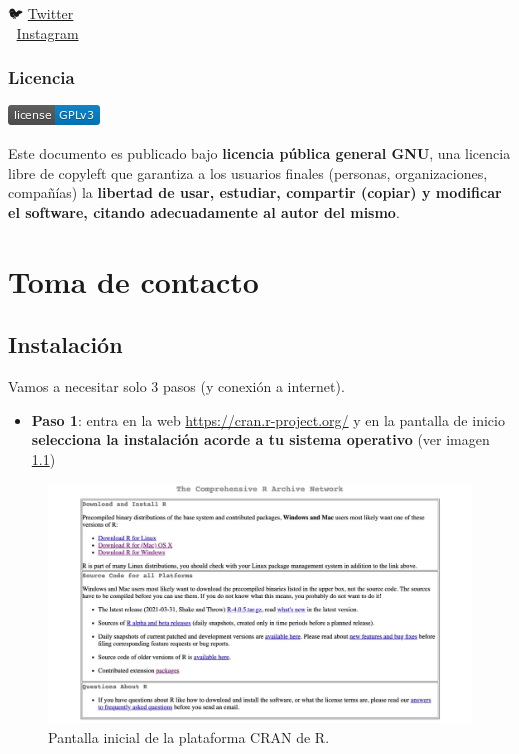\documentclass[11pt,]{book}
\providecommand{\tightlist}{%
  \setlength{\itemsep}{0pt}\setlength{\parskip}{0pt}}
\begin{document}
🐦 \href{twitter.com/dadosdelaplace}{Twitter}\\
📸 \href{instagram.com/javieralvarezliebana}{Instagram}

\hypertarget{licencia}{%
\section*{Licencia}\label{licencia}}


\href{https://www.gnu.org/licenses/gpl-3.0}{\includegraphics{img/license-GPLv3-blue.png}}

Este documento es publicado bajo \textbf{licencia pública general GNU}, una licencia libre de copyleft que garantiza a los usuarios finales (personas, organizaciones, compañías) la \textbf{libertad de usar, estudiar, compartir (copiar) y modificar el software, citando adecuadamente al autor del mismo}.

\hypertarget{part-toma-de-contacto}{%
\part{Toma de contacto}\label{part-toma-de-contacto}}

\hypertarget{instalacionR}{%
\chapter{Instalación}\label{instalacionR}}

Vamos a necesitar solo 3 pasos (y conexión a internet).

\begin{itemize}
\tightlist
\item
  \textbf{Paso 1}: entra en la web \url{https://cran.r-project.org/} y en la pantalla de inicio \textbf{selecciona la instalación acorde a tu sistema operativo} (ver imagen \ref{fig:pantalla-cran})
\end{itemize}

\begin{figure}

{\centering \includegraphics[width=0.6\linewidth]{./img/pantalla1_cran} 

}

\caption{Pantalla inicial de la plataforma CRAN de R.}\label{fig:pantalla-cran}
\end{figure}
\end{document}
